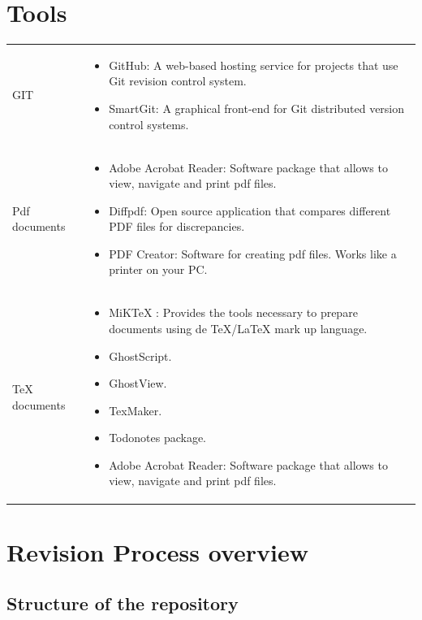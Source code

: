 \documentclass{template/openetcs_article}
\begin{document}
\section{Tools}

\begin{flushleft}

\begin{tabular}{|m{3cm}|m{11cm}|}
\hline
\rowcolor{myblue}
\multicolumn{2}{|c|}{Tools} \\\hline
GIT &
\begin{itemize}
\item GitHub: A web-based hosting service for projects that use Git revision control system.
\item SmartGit: A graphical front-end for Git distributed version control systems. 
\end{itemize}\\\hline
Pdf documents &
\begin{itemize}
\item Adobe Acrobat Reader: Software package that allows to view, navigate and print pdf files.
\item Diffpdf: Open source application that compares different PDF files for discrepancies. 
\item {PDF Creator: Software for creating pdf files. Works like a printer on your PC.}
\end{itemize}\\\hline
TeX documents &
\begin{itemize}
\item MiKTeX : Provides the tools necessary to prepare documents using de TeX/LaTeX mark up language.
\item GhostScript. 
\item GhostView.
\item TexMaker.
\item Todonotes package.
\item Adobe Acrobat Reader: Software package that allows to view, navigate and print pdf files.
\end{itemize}\\\hline
\end{tabular}
\end{flushleft}

\section{Revision Process overview}
\subsection{Structure of the repository}
 
\end{document}
